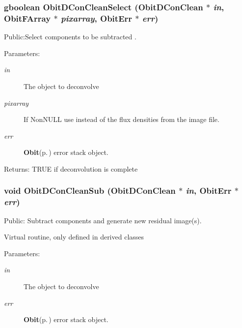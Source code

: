 \subsubsection{\setlength{\rightskip}{0pt plus 5cm}gboolean Obit\-DCon\-Clean\-Select ({\bf Obit\-DCon\-Clean} $\ast$ {\em in}, {\bf Obit\-FArray} $\ast$ {\em pixarray}, {\bf Obit\-Err} $\ast$ {\em err})}\label{ObitDConClean_8c_a22}


Public:Select components to be subtracted . 

\begin{Desc}
\item[Parameters:]
\begin{description}
\item[{\em in}]The object to deconvolve \item[{\em pixarray}]If Non\-NULL use instead of the flux densities from the image file. \item[{\em err}]{\bf Obit}{\rm (p.\,\pageref{structObit})} error stack object. \end{description}
\end{Desc}
\begin{Desc}
\item[Returns:]TRUE if deconvolution is complete \end{Desc}
\subsubsection{\setlength{\rightskip}{0pt plus 5cm}void Obit\-DCon\-Clean\-Sub ({\bf Obit\-DCon\-Clean} $\ast$ {\em in}, {\bf Obit\-Err} $\ast$ {\em err})}\label{ObitDConClean_8c_a23}


Public: Subtract components and generate new residual image(s). 

Virtual routine, only defined in derived classes \begin{Desc}
\item[Parameters:]
\begin{description}
\item[{\em in}]The object to deconvolve \item[{\em err}]{\bf Obit}{\rm (p.\,\pageref{structObit})} error stack object. \end{description}
\end{Desc}
